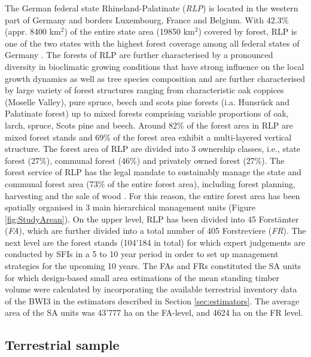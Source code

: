 The German federal state Rhineland-Palatinate (\textit{RLP}) is located in the western part of Germany and borders Luxembourg, France and Belgium. With 42.3\% (appr. 8400 km$^2$) of the entire state area (19850 km$^2$) covered by forest, RLP is one of the two states with the highest forest coverage among all federal states of Germany \citep{bwi3}. The forests of RLP are further characterised by a pronounced diversity in bioclimatic growing conditions that have strong influence on the local growth dynamics as well as tree species composition \citep{gauer2005} and are further characterised by large variety of forest structures ranging from characteristic oak coppices (Moselle Valley), pure spruce, beech and scots pine forests (i.a. Hunsr{\"u}ck and Palatinate forest) up to mixed forests comprising variable proportions of oak, larch, spruce, Scots pine and beech. Around 82\% of the forest area in RLP are mixed forest stands and 69\% of the forest area exhibit a multi-layered vertical structure. The forest area of RLP are divided into 3 ownership classes, i.e., state forest (27\%), communal forest (46\%) and privately owned forest (27\%). The forest service of RLP has the legal mandate to sustainably manage the state and communal forest area (73\% of the entire forest area), including forest planning, harvesting and the sale of wood \citep{lwaldg_rlp}. For this reason, the entire forest area has been spatially organised in 3 main hierarchical management units (Figure \ref{fig:StudyArean}). On the upper level, RLP has been divided into 45 Forst{\"a}mter (\textit{FA}), which are further divided into a total number of 405 Forstreviere (\textit{FR}). The next level are the forest stands (104'184 in total) for which expert judgements are conducted by SFIs in a 5 to 10 year period in order to set up management strategies for the upcoming 10 years. The FAs and FRs constituted the SA units for which design-based small area estimations of the mean standing timber volume were calculated by incorporating the available terrestrial inventory data of the BWI3 in the estimators described in Section \ref{sec:estimators}. The average area of the SA units was 43'777 ha on the FA-level, and 4624 ha on the FR level.


\subsection{Terrestrial sample}

